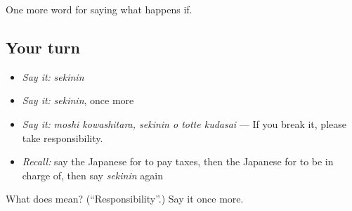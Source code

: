 \begin{grammarlens}[title={What you've built}]
One more word for saying what happens if.
\end{grammarlens}

\subsection*{Your turn}
\begin{itemize}
\raggedright
  \item \emph{Say it:} \emph{sekinin}
  \item \emph{Say it:} \emph{sekinin}, once more
  \item \emph{Say it:} \emph{moshi kowashitara, sekinin o totte kudasai} — If you break it, please take responsibility.
  \item \emph{Recall:} say the Japanese for to pay taxes, then the Japanese for to be in charge of, then say \emph{sekinin} again
\end{itemize}

\begin{tcolorbox}[breakable,colback=teal!4,colframe=teal!35!black,title={Before you move on}]
What does  mean? (\textquotedblleft{}Responsibility\textquotedblright{}.) Say it once more.
\end{tcolorbox}
